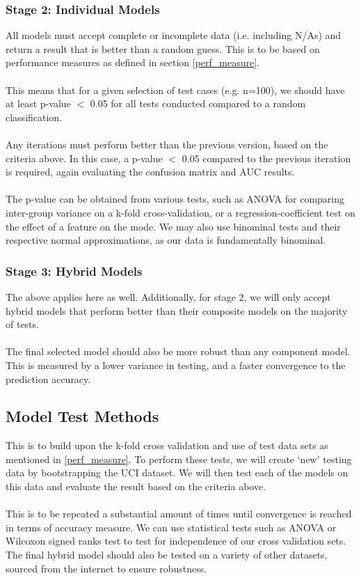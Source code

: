 \documentclass[a4paper, 12pt]{article}
\begin{document}
        \subsubsection{Stage 2: Individual Models}
        All models must accept complete or incomplete data (i.e. including N/As) and return a result that is better than a random guess. This is to be based on performance measures as defined in section \ref{perf_measure}. 
        \\\\
        This means that for a given selection of test cases (e.g. n=100), we should have at least p-value $<$ 0.05 for all tests conducted compared to a random classification. 
        \\\\
        Any iterations must perform better than the previous version, based on the criteria above. In this case, a p-value $<$ 0.05 compared to the previous iteration is required, again evaluating the confusion matrix and AUC results. 
        \\\\
        The p-value can be obtained from various tests, such as ANOVA for comparing inter-group variance on a k-fold cross-validation, or a regression-coefficient test on the effect of a feature on the mode. We may also use binominal tests and their respective normal approximations, as our data is fundamentally binominal.
        
        \subsubsection{Stage 3: Hybrid Models}
        The above applies here as well. Additionally, for stage 2, we will only accept hybrid models that perform better than their composite models on the majority of tests. 
        \\\\
        The final selected model should also be more robust than any component model. This is measured by a lower variance in testing, and a faster convergence to the prediction accuracy.
        
    \subsection{Model Test Methods}
    This is to build upon the k-fold cross validation and use of test data sets as mentioned in \ref{perf_measure}. To perform these tests, we will create `new' testing data by bootstrapping the UCI dataset. We will then test each of the models on this data and evaluate the result based on the criteria above. 
    \\\\    
    This is to be repeated a substantial amount of times until convergence is reached in terms of accuracy measure. We can use statistical tests such as ANOVA or Wilcoxon signed ranks test to test for independence of our cross validation sets. The final hybrid model should also be tested on a variety of other datasets, sourced from the internet to ensure robustness. 
\end{document}
